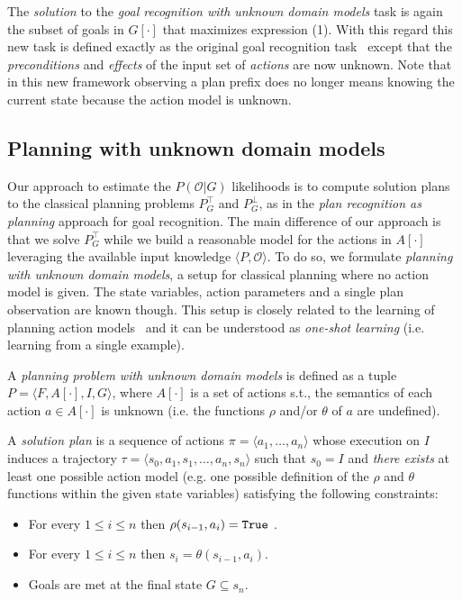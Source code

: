\documentclass[letterpaper]{article} %
\newcommand{\tup}[1]{{\langle #1 \rangle}}
\begin{document}
The {\em solution} to the {\em goal recognition with unknown domain models} task is again the subset of goals in $G[\cdot]$ that maximizes expression (1). With this regard this new task is defined exactly as the original goal recognition task~\cite{ramirez2012plan} except that the {\em preconditions} and {\em effects} of the input set of {\em actions} are now unknown. Note that in this new framework observing a plan prefix does no longer means knowing the current state because the action model is unknown.

\subsection{Planning with unknown domain models}
Our approach to estimate the $P(\mathcal{O}|G)$ likelihoods is to compute solution plans to the classical planning problems $P^{\top}_G$ and $P^{\bot}_G$, as in the {\em plan recognition as planning} approach for goal recognition. The main difference of our approach is that we solve $P^{\top}_G$ while we build a reasonable model for the actions in $A[\cdot]$ leveraging the available input knowledge $\tup{P,\mathcal{O}}$. To do so, we formulate {\em planning with unknown domain models}, a setup for classical planning where no action model is given. The state variables, action parameters and a single plan observation are known though. This setup is closely related to the learning of planning action models~\cite{SternJ17} and it can be understood as {\em one-shot learning} (i.e. learning from a single example).

A {\em planning problem with unknown domain models} is defined as a tuple $P=\tup{F,A[\cdot],I,G}$, where $A[\cdot]$ is a set of actions s.t., the semantics of each action $a\in A[\cdot]$ is unknown (i.e. the functions $\rho$ and/or $\theta$ of $a$ are undefined).

A {\em solution plan} is a sequence of actions $\pi=\tup{a_1, \ldots, a_n}$ whose execution on $I$ induces a trajectory $\tau=\tup{s_0, a_1, s_1, \ldots, a_n, s_n}$ such that $s_0=I$ and {\em there exists} at least one possible action model (e.g. one possible definition of the $\rho$ and $\theta$ functions within the given state variables) satisfying the following constraints:
\begin{itemize}
\item For every {\small $1\leq i\leq n$} then $\rho(s_{i-1},a_i)={\tt\small True}$ .
\item For every {\small $1\leq i\leq n$} then $s_i=\theta(s_{i-1},a_i)$.
\item Goals are met at the final state $G\subseteq s_n$. 
\end{itemize}
\end{document}
